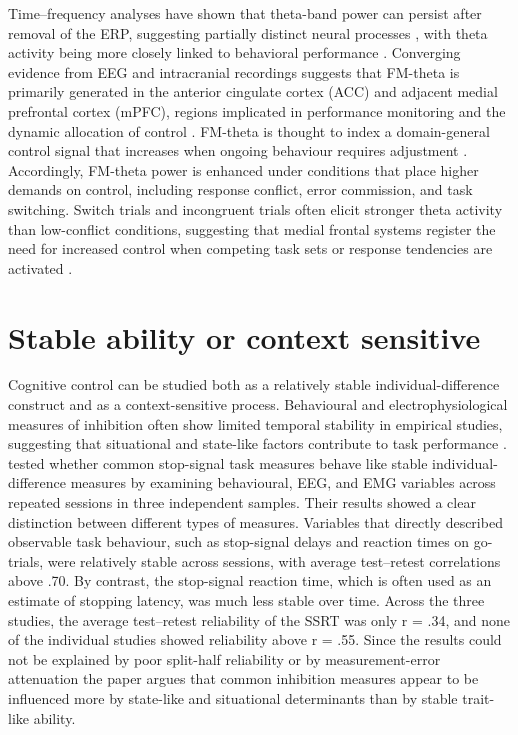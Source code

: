 \documentclass[12pt,a4paper]{report}
\begin{document}
Time–frequency analyses have shown that theta-band power can persist after removal of the ERP, suggesting partially distinct neural processes \parencite{herrmann2014timefrequencytutorial}, with theta activity being more closely linked to behavioral performance \parencite{cohen2013thetaconflict}. Converging evidence from EEG and intracranial recordings suggests that FM-theta is primarily generated in the anterior cingulate cortex (ACC) and adjacent medial prefrontal cortex (mPFC), regions implicated in performance monitoring and the dynamic allocation of control \parencite{cavanagh2014theta,depestele2023thetadriving}. FM-theta is thought to index a domain-general control signal that increases when ongoing behaviour requires adjustment \parencite{cavanagh2014theta,cavanagh2015metatheta}. Accordingly, FM-theta power is enhanced under conditions that place higher demands on control, including response conflict, error commission, and task switching. Switch trials and incongruent trials often elicit stronger theta activity than low-conflict conditions, suggesting that medial frontal systems register the need for increased control when competing task sets or response tendencies are activated \parencite{cohen2013thetaconflict, cavanagh2014theta}. 


\section{Stable ability or context sensitive}

Cognitive control can be studied both as a relatively stable individual-difference construct and as a context-sensitive process. Behavioural and electrophysiological measures of inhibition often show limited temporal stability in empirical studies, suggesting that situational and state-like factors contribute to task performance \parencite{thunberg2024unreliability,fassbender2023lst}. 
\textcite{thunberg2024unreliability} tested whether common stop-signal task measures behave like stable individual-difference measures by examining behavioural, EEG, and EMG variables across repeated sessions in three independent samples. Their results showed a clear distinction between different types of measures. Variables that directly described observable task behaviour, such as stop-signal delays and reaction times on go-trials, were relatively stable across sessions, with average test–retest correlations above .70. By contrast, the stop-signal reaction time, which is often used as an estimate of stopping latency, was much less stable over time. Across the three studies, the average test–retest reliability of the SSRT was only r = .34, and none of the individual studies showed reliability above r = .55. Since the results could not be explained by poor split-half reliability or by measurement-error attenuation the paper argues that common inhibition measures appear to be influenced more by state-like and situational determinants than by stable trait-like ability.
\end{document}
